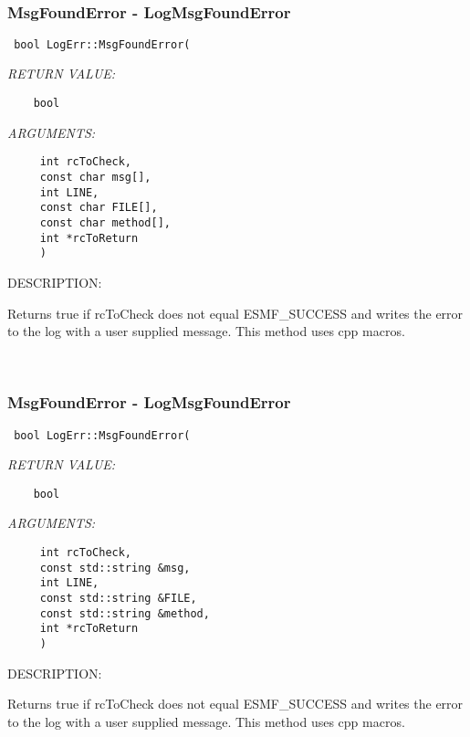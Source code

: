 {\mbox{}\hrulefill\ 
 
\subsubsection [MsgFoundError] {MsgFoundError - LogMsgFoundError}


  
\begin{verbatim} 
 bool LogErr::MsgFoundError(
 \end{verbatim}{\em RETURN VALUE:}
\begin{verbatim}    bool\end{verbatim}{\em ARGUMENTS:}
\begin{verbatim}     int rcToCheck,
     const char msg[],
     int LINE,
     const char FILE[],
     const char method[],
     int *rcToReturn
     )\end{verbatim}
{\sf DESCRIPTION:\\ }


   Returns true if rcToCheck does not equal ESMF\_SUCCESS and writes the error
   to the log with a user supplied message.  This method uses cpp macros. 
 
\mbox{}\hrulefill\ 
 
\subsubsection [MsgFoundError] {MsgFoundError - LogMsgFoundError}


  
\begin{verbatim} 
 bool LogErr::MsgFoundError(
 \end{verbatim}{\em RETURN VALUE:}
\begin{verbatim}    bool\end{verbatim}{\em ARGUMENTS:}
\begin{verbatim}     int rcToCheck,
     const std::string &msg,
     int LINE,
     const std::string &FILE,
     const std::string &method,
     int *rcToReturn
     )\end{verbatim}
{\sf DESCRIPTION:\\ }


   Returns true if rcToCheck does not equal ESMF\_SUCCESS and writes the error
   to the log with a user supplied message.  This method uses cpp macros. 
 
}

